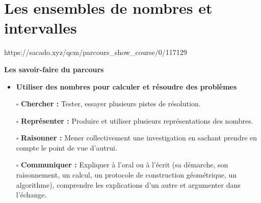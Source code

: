 \chapter{Les ensembles de nombres et intervalles}
{https://sacado.xyz/qcm/parcours_show_course/0/117129}
{


 \begin{CpsCol}
\textbf{Les savoir-faire du parcours}
 \begin{itemize}
 \item \textbf{Utiliser des nombres pour calculer et résoudre des problèmes}
\item[$\square$] \textbf{Chercher :}  Tester, essayer plusieurs pistes de résolution.
\item[$\square$] \textbf{Représenter :} Produire et utiliser plusieurs représentations des nombres.
\item[$\square$] \textbf{Raisonner :} Mener collectivement une investigation en sachant prendre en compte le point de vue d’autrui.
\item[$\square$] \textbf{Communiquer :} Expliquer à l’oral ou à l’écrit (sa démarche, son raisonnement, un calcul, un protocole de construction géométrique, un algorithme), comprendre les explications d’un autre
et argumenter dans l’échange.
 \end{itemize}
 \end{CpsCol}

}

\begin{pageCours}


 \end{pageCours}

